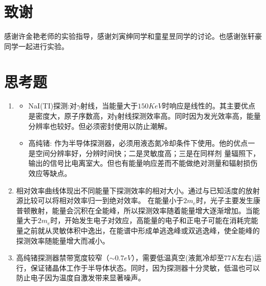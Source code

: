 \documentclass{article}
\begin{document}
\section{致谢}
    感谢许金艳老师的实验指导，感谢刘寅绅同学和童星昱同学的讨论。也感谢张轩豪同学一起进行实验。
    \clearpage
    \appendix
    \appendixpage
    \section{思考题}
    \begin{enumerate}
        \item \begin{itemize}
            \item NaI(TI)探测:对$\gamma$射线，当能量大于$150\si{KeV}$时响应是线性的。其主要优点是密度大，原子序数高，对γ射线探测效率高。同时因为发光效率高，能量分辨率也较好。但必须密封使用以防止潮解。
            \item 高纯锗: 作为半导体探测器，必须用液态氮冷却条件下使用。他的优点一是空间分辨率好，分辨时间快；二是灵敏度高；三是在同样剂 量辐照下，输出的信号比电离室大。但也有能量响应差而不能做绝对测量和辐射损伤效应等缺点。
        \end{itemize}
        \item 相对效率曲线体现出不同能量下探测效率的相对大小。通过与已知活度的放射源比较可以将相对效率归一到绝对效率。
        在能量小于$2m_{e}$时，光子主要发生康普顿散射，能量会沉积在全能峰，所以探测效率随着能量增大逐渐增加。当能量大于$2m_{e}$时，开始发生电子对效应，高能量的电子和正电子可能在消耗完能量之前就从灵敏体积中逸出，在能谱中形成单逃逸峰或双逃逸峰，使全能峰的探测效率随能量增大而减小。
        \item 高纯锗探测器禁带宽度较窄（$\sim 0.7\si{eV}$），需要低温真空(液氮冷却至$77\si{K}$左右)运
        行，保证锗晶体工作于半导体状态。同时，因为探测器十分灵敏，低温也可以防止电子因为温度自激发带来显著噪声。 
    \end{enumerate}
\end{document}
